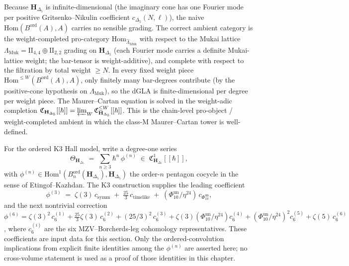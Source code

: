 \begin{remark}
\label{rem:c1-weight-completion-k3-convolution}
Because $\mathbf{H}_{\Delta_5}$ is infinite-dimensional (the imaginary
cone has one Fourier mode per positive Gritsenko--Nikulin coefficient
$c_{\Delta_5}(N,\ell)$), the naive
$\mathrm{Hom}(B^{\mathrm{ord}}(A),A)$ carries no sensible grading.
The correct ambient category is the weight-completed pro-category
$\mathrm{Hom}_{\widehat{\Lambda}_{\mathrm{Muk}}}$ with respect to the
Mukai lattice $\Lambda_{\mathrm{Muk}} = \mathrm{II}_{4,4}\oplus\mathrm{II}_{2,2}$
grading on $\mathbf{H}_{\Delta_5}$ (each Fourier mode carries a definite
Mukai-lattice weight; the bar-tensor is
weight-additive), and complete with respect to the filtration by
total weight $\ge N$. In every fixed weight piece
$\mathrm{Hom}^{\le W}(B^{\mathrm{ord}}(A),A)$, only finitely many
bar-degrees contribute (by the positive-cone hypothesis on
$\Lambda_{\mathrm{Muk}}$), so the dGLA is finite-dimensional per
degree per weight piece. The Maurer--Cartan equation is solved in the
weight-adic completion
$\mathfrak{C}_{\mathbf{H}_{\Delta_5}}[[\hbar]] =
\varprojlim_W \mathfrak{C}_{\mathbf{H}_{\Delta_5}}^{\le W}[[\hbar]]$.
This is the chain-level pro-object / weight-completed ambient in which
the class-M Maurer--Cartan tower is well-defined.
\end{remark}

\begin{definition}
\label{rem:theta-universal-MC-k3}
For the ordered K3 Hall model, write a degree-one series
\[
 \Theta_{\mathbf{H}_{\Delta_5}}
 \;=\; \sum_{n\ge 3} \hbar^n\,\phi^{(n)}
 \;\in\; \mathfrak{C}^1_{\mathbf{H}_{\Delta_5}}[[\hbar]],
\]
with $\phi^{(n)}\in \mathrm{Hom}^1(B^{\mathrm{ord}}_n(\mathbf{H}_{\Delta_5}),
\mathbf{H}_{\Delta_5})$ the order-$n$ pentagon cocycle in the
sense of Etingof--Kazhdan. The K3 construction supplies the leading
coefficient
\[
 \phi^{(3)}
 \;=\;
 \zeta(3)\,c_{\mathrm{symm}}
 \;+\;\tfrac{25}{3}\,c_{\mathrm{timelike}}
 \;+\; (\Phi_{10}^{\mathrm{un}}/\eta^{24})\, c_{\Phi_{10}^{\mathrm{un}}},
\]
and the next nontrivial correction
$\phi^{(6)} = \zeta(3)^2\, c_6^{(1)} + \tfrac{25}{3}\zeta(3)\, c_6^{(2)}
+ (25/3)^2\, c_6^{(3)} + \zeta(3)(\Phi_{10}^{\mathrm{un}}/\eta^{24})c_6^{(4)}
+ (\Phi_{10}^{\mathrm{un}}/\eta^{24})^2 c_6^{(5)} + \zeta(5)\, c_6^{(6)}$,
where $c_6^{(i)}$ are the six MZV--Borcherds-leg cohomology
representatives. These coefficients are input data for this section.
Only the ordered-convolution implications from explicit finite
identities among the $\phi^{(n)}$ are asserted here; no cross-volume
statement is used as a proof of those identities in this chapter.
\end{definition}

